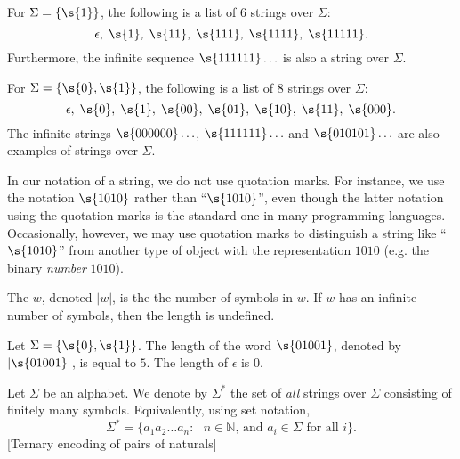 \begin{example} \label{example:Strings-over-the-unary-alphabet}
For $\Sigma = \{\s{1}\}$, the following is a list of 6 strings over $\Sigma$: 
\[
    \epsilon,\; \s{1},\; \s{11},\; \s{111},\; \s{1111},\; \s{11111}.
\]
Furthermore, the infinite sequence $\s{111111}\ldots$ is also a string over $\Sigma$.
\end{example}

\begin{example} \label{example:Strings-over-the-binary-alphabet}
For $\Sigma = \{\s{0},\s{1}\}$, the following is a list of 8 strings over $\Sigma$: 
\[
\epsilon,\; \s{0},\; \s{1},\; \s{00},\; \s{01},\; \s{10},\; \s{11},\; \s{000}.
\] 
The infinite strings $\s{000000}\ldots$, $\s{111111}\ldots$ and $\s{010101}\ldots$ are also examples of strings over $\Sigma$.
\end{example}

\begin{note} \label{note:Strings-and-quotation-marks}
In our notation of a string, we do not use quotation marks. For instance, we use the notation $\s{1010}$ rather than ``$\s{1010}$'', even though the latter notation using the quotation marks is the standard one in many programming languages. Occasionally, however, we may use quotation marks to distinguish a string like ``$\s{1010}$'' from another type of object with the representation $1010$ (e.g. the binary \emph{number} $1010$).
\end{note}

\begin{definition} \label{definition:Length-of-a-string}
The  $w$, denoted $|w|$, is the the number of symbols in $w$. 
If $w$ has an infinite number of symbols, then the length is undefined.
\end{definition}

\begin{example} \label{example:Lengths-of-01001-and-epsilon}
Let $\Sigma=\{\s{0},\s{1}\}$. 
The length of the word $\s{01001}$, denoted by $|\s{01001}|$, is equal to $5$. 
The length of $\epsilon$ is 0.
\end{example}

\begin{definition} \label{definition:Star-operation-on-alphabets}
Let $\Sigma$ be an alphabet. 
We denote by $\Sigma^*$ the set of \emph{all} strings over $\Sigma$ consisting of finitely many symbols. 
Equivalently, using set notation,
\[
    \Sigma^* = \{a_1a_2\ldots a_n : \text{ $n \in \mathbb{N}$, and $a_i \in \Sigma$ for all $i$}\}.
\][Ternary encoding of pairs of naturals] 
\end{definition}

